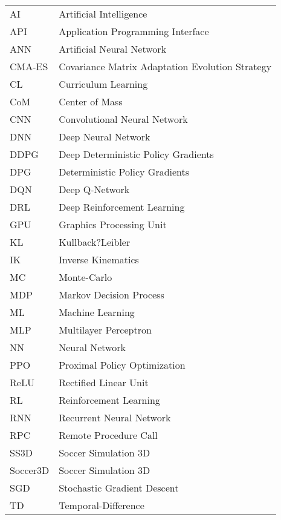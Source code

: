 \begin{longtable}{ll}
AI & Artificial Intelligence \\
API & Application Programming Interface \\
ANN & Artificial Neural Network \\
CMA-ES & Covariance Matrix Adaptation Evolution Strategy \\
CL & Curriculum Learning \\
CoM & Center of Mass \\
CNN & Convolutional Neural Network \\
DNN & Deep Neural Network \\
DDPG & Deep Deterministic Policy Gradients \\
DPG & Deterministic Policy Gradients \\
DQN & Deep Q-Network \\
DRL & Deep Reinforcement Learning \\
GPU & Graphics Processing Unit \\
KL & Kullback?Leibler \\
IK & Inverse Kinematics \\
MC & Monte-Carlo \\
MDP & Markov Decision Process \\
ML & Machine Learning \\
MLP & Multilayer Perceptron \\
NN & Neural Network \\
PPO & Proximal Policy Optimization \\ 
ReLU & Rectified Linear Unit \\
RL & Reinforcement Learning \\
RNN & Recurrent Neural Network \\
RPC & Remote Procedure Call \\
SS3D & Soccer Simulation 3D \\
Soccer3D & Soccer Simulation 3D \\
SGD & Stochastic Gradient Descent \\
TD & Temporal-Difference \\

\end{longtable}

